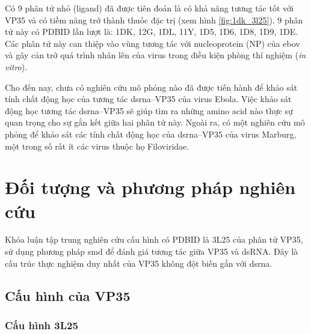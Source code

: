 \documentclass[12pt,a4paper,reqno, oneside]{book}
\begin{document}
	Có 9 phân tử nhỏ (ligand) đã được tiên đoán là có khả năng tương tác tốt với VP35 và có tiềm năng trở thành thuốc đặc trị\cite{Brown2014,Dapiaggi2015} (xem hình \ref{fig:1dk_3l25}). 9 phân tử này có PDBID lần lượt là: 1DK, 12G, 1DL, 11Y, 1D5, 1D6, 1D8, 1D9, 1DE. Các phân tử này can thiệp vào vùng tương tác với nucleoprotein (NP) của \gls{ebov} và gây cản trở quá trình nhân lên của virus trong điều kiện phòng thí nghiệm (\emph{in vitro}).
	
	Cho đến nay, chưa có nghiên cứu mô phỏng nào đã được tiến hành để khảo sát tính chất động học của tương tác \gls{dsrna}--VP35 của virus Ebola. Việc khảo sát động học tương tác \gls{dsrna}--VP35 sẽ giúp tìm ra những amino acid nào thực sự quan trọng cho sự gắn kết giữa hai phân tử này. Ngoài ra, có một nghiên cứu mô phỏng để khảo sát các tính chất động học của \gls{dsrna}--VP35 của virus Marburg, một trong số rất ít các virus thuộc họ Filoviridae\cite{Xue2014}.
	
	



\newpage
\pagestyle{fancy}
\setcounter{chapter}{1}
\chapter{Đối tượng và phương pháp nghiên cứu}

	Khóa luận tập trung nghiên cứu cấu hình có PDBID là 3L25 của phân tử VP35, sử dụng phương pháp \gls{smd} để đánh giá tương tác giữa VP35 và dsRNA. Đây là cấu trúc thực nghiệm duy nhất của VP35 không đột biến gắn với \gls{dsrna}.
\section{Cấu hình của VP35}
	\subsection{Cấu hình 3L25}
	
\end{document}
